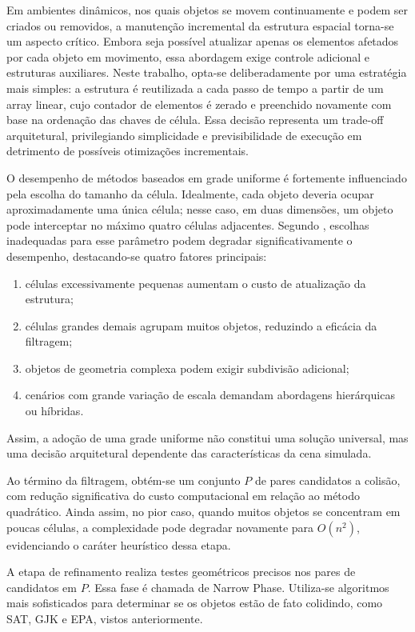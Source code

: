 Em ambientes dinâmicos, nos quais objetos se movem continuamente e podem ser criados ou removidos, a manutenção incremental da estrutura espacial torna-se um aspecto crítico. Embora seja possível atualizar apenas os elementos afetados por cada objeto em movimento, essa abordagem exige controle adicional e estruturas auxiliares. Neste trabalho, opta-se deliberadamente por uma estratégia mais simples: a estrutura é reutilizada a cada passo de tempo a partir de um array linear, cujo contador de elementos é zerado e preenchido novamente com base na ordenação das chaves de célula. Essa decisão representa um trade-off arquitetural, privilegiando simplicidade e previsibilidade de execução em detrimento de possíveis otimizações incrementais.

O desempenho de métodos baseados em grade uniforme é fortemente influenciado pela escolha do tamanho da célula. Idealmente, cada objeto deveria ocupar aproximadamente uma única célula; nesse caso, em duas dimensões, um objeto pode interceptar no máximo quatro células adjacentes. Segundo , escolhas inadequadas para esse parâmetro podem degradar significativamente o desempenho, destacando-se quatro fatores principais:
\begin{enumerate}
	\item células excessivamente pequenas aumentam o custo de atualização da estrutura;
	\item células grandes demais agrupam muitos objetos, reduzindo a eficácia da filtragem;
	\item objetos de geometria complexa podem exigir subdivisão adicional;
	\item cenários com grande variação de escala demandam abordagens hierárquicas ou híbridas.
\end{enumerate}
Assim, a adoção de uma grade uniforme não constitui uma solução universal, mas uma decisão arquitetural dependente das características da cena simulada.

Ao término da filtragem, obtém-se um conjunto $P$ de pares candidatos a colisão, com redução significativa do custo computacional em relação ao método quadrático. Ainda assim, no pior caso, quando muitos objetos se concentram em poucas células, a complexidade pode degradar novamente para $O(n^2)$, evidenciando o caráter heurístico dessa etapa.

A etapa de refinamento realiza testes geométricos precisos nos pares de candidatos em $P$. Essa fase é chamada de Narrow Phase. Utiliza-se algoritmos mais sofisticados para determinar se os objetos estão de fato colidindo, como SAT, GJK e EPA, vistos anteriormente. %

